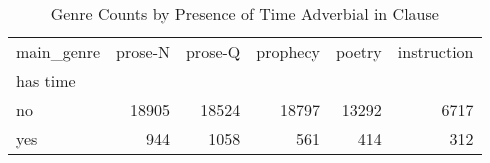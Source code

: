 \begin{table}[htbp!]
\centering
\caption{Genre Counts by Presence of Time Adverbial in Clause}
\label{table:allcl_genre_ct}
\begin{tabular}{lrrrrr}
\toprule
main\_genre &  prose-N &  prose-Q &  prophecy &  poetry &  instruction \\
has time &          &          &           &         &              \\
\midrule
no       &    18905 &    18524 &     18797 &   13292 &         6717 \\
yes      &      944 &     1058 &       561 &     414 &          312 \\
\bottomrule
\end{tabular}
\end{table}
